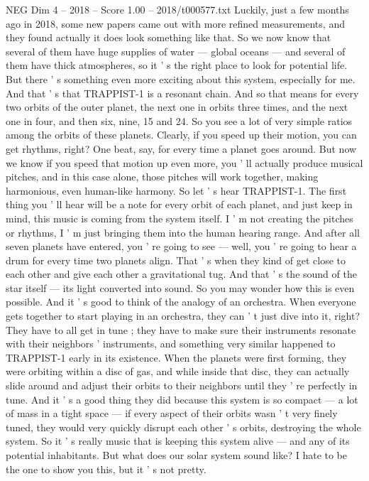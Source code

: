 \begin{textsample}{NEG Dim 4 – 2018 – Score 1.00 – 2018/t000577.txt}
Luckily, just a few months ago in 2018, some new papers came out with more refined measurements, and they found actually it does look something like that.
So we now know that several of them have huge supplies of water — global oceans — and several of them have thick atmospheres, so it ' s the right place to look for potential life.
But there ' s something even more exciting about this system, especially for me.
And that ' s that TRAPPIST-1 is a resonant chain.
And so that means for every two orbits of the outer planet, the next one in orbits three times, and the next one in four, and then six, nine, 15 and 24.
So you see a lot of very simple ratios among the orbits of these planets.
Clearly, if you speed up their motion, you can get rhythms, right?
One beat, say, for every time a planet goes around.
But now we know if you speed that motion up even more, you ' ll actually produce musical pitches, and in this case alone, those pitches will work together, making harmonious, even human-like harmony.
So let ' s hear TRAPPIST-1.
The first thing you ' ll hear will be a note for every orbit of each planet, and just keep in mind, this music is coming from the system itself.
I ' m not creating the pitches or rhythms, I ' m just bringing them into the human hearing range.
And after all seven planets have entered, you ' re going to see — well, you ' re going to hear a drum for every time two planets align.
That ' s when they kind of get close to each other and give each other a gravitational tug.
And that ' s the sound of the star itself — its light converted into sound.
So you may wonder how this is even possible.
And it ' s good to think of the analogy of an orchestra.
When everyone gets together to start playing in an orchestra, they can ' t just dive into it, right?
They have to all get in tune ; they have to make sure their instruments resonate with their neighbors ' instruments, and something very similar happened to TRAPPIST-1 early in its existence.
When the planets were first forming, they were orbiting within a disc of gas, and while inside that disc, they can actually slide around and adjust their orbits to their neighbors until they ' re perfectly in tune.
And it ' s a good thing they did because this system is so compact — a lot of mass in a tight space — if every aspect of their orbits wasn ' t very finely tuned, they would very quickly disrupt each other ' s orbits, destroying the whole system.
So it ' s really music that is keeping this system alive — and any of its potential inhabitants.
But what does our solar system sound like?
I hate to be the one to show you this, but it ' s not pretty.

\end{textsample}
